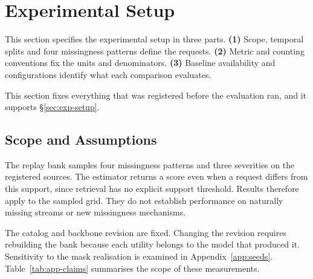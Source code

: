 \documentclass{article}
\begin{document}
\section{Experimental Setup}
\label{app:protocol}

This section specifies the experimental setup in three parts. \textbf{(1)} Scope, temporal splits and four missingness patterns define the requests. \textbf{(2)} Metric and counting conventions fix the units and denominators. \textbf{(3)} Baseline availability and configurations identify what each comparison evaluates.

This section fixes everything that was registered before the evaluation ran, and it
supports \S\ref{sec:exp-setup}.

\subsection{Scope and Assumptions}
\label{app:scope}
The replay bank samples four missingness patterns and three severities on the registered
sources. The estimator returns a score even when a request differs from this support, since
retrieval has no explicit support threshold. Results therefore apply to the sampled grid.
They do not establish performance on naturally missing streams or new missingness mechanisms.

The catalog and backbone revision are fixed. Changing the revision requires rebuilding the
bank because each utility belongs to the model that produced it. Sensitivity to the mask
realisation is examined in Appendix~\ref{app:seeds}.
Table~\ref{tab:app-claims} summarises the scope of these measurements.
\end{document}
